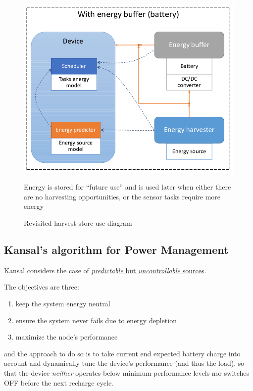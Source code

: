 \begin{figure}[htbp]
   \centering
   \includegraphics{images/harveststoreuse_revisited.png}
   \caption{Revisited harvest-store-use diagram}
   \label{fig:harveststoreuse_revisited}
   Energy is stored for ``future use'' and is used later when either there are no harvesting opportunities, or the sensor tasks require more energy
\end{figure}

\subsection{Kansal's algorithm for Power Management}
Kansal considers the case of \ul{\textit{predictable} but \textit{uncontrollable} sources}.

The objectives are three:
\begin{enumerate}
   \item keep the system energy neutral
   \item ensure the system never fails due to energy depletion
   \item maximize the node's performance
\end{enumerate}
and the approach to do so is to take current end expected battery charge into account and dynamically tune the device’s performance (and thus the load),
so that the device \textit{neither} operates below minimum performance levels nor switches OFF before the next recharge cycle.


